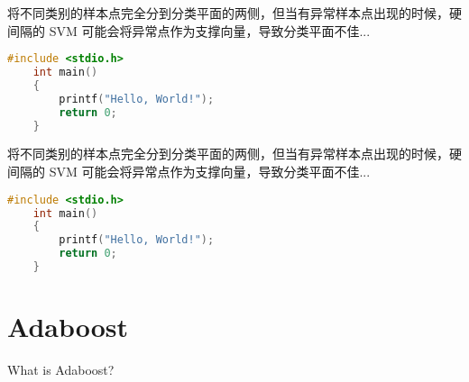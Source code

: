 \documentclass[forprint]{report}
\begin{document}
将不同类别的样本点完全分到分类平面的两侧，但当有异常样本点出现的时候，硬间隔的 SVM 可能会将异常点作为支撑向量，导致分类平面不佳\cite{r1}...

\begin{lstlisting}[language=c]
	#include <stdio.h>
	int main()
	{
		printf("Hello, World!");
		return 0;
	}
\end{lstlisting}

将不同类别的样本点完全分到分类平面的两侧，但当有异常样本点出现的时候，硬间隔的 SVM 可能会将异常点作为支撑向量，导致分类平面不佳\cite{r1}...

\begin{lstlisting}[language=c]
	#include <stdio.h>
	int main()
	{
		printf("Hello, World!");
		return 0;
	}
\end{lstlisting}

\chapter{Adaboost}
	
What is Adaboost?



\pagestyle{mybibli}
\cleardoublepage{}
{}
%
\renewcommand{\baselinestretch}{1.6}
\end{document}
